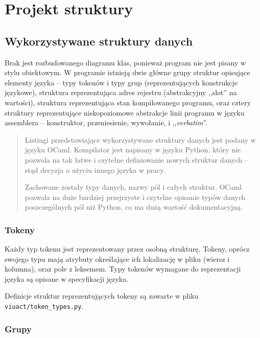 \section{Projekt struktury}

\subsection{Wykorzystywane struktury danych}

Brak jest rozbudowanego diagramu klas, ponieważ program nie jest pisany w stylu obiektowym.
W programie istnieją dwie główne grupy struktur opisujące elementy języka -- typy tokenów i typy grup
(reprezentujących konstrukcje językowe), struktura reprezentująca adres rejestru (abstrakcyjny ,,slot'' na
wartości), struktura reprezentująca stan kompilowanego programu, oraz cztery struktury reprezentujące
niskopoziomowe abstrakcje linii programu w języku assemblera -- konstruktor, przeniesienie, wywołanie, i
,,\emph{verbatim}''.

\begin{quote}
    Listingi przedstawiające wykorzystywane struktury danych jest podany w języku OCaml.
    Kompilator jest napisany w języku Python, który nie pozwala na tak łatwe i czytelne definiowanie
    nowych struktur danych -- stąd decyzja o użyciu innego języka w pracy.

    Zachowane zostały typy danych, nazwy pól i całych struktur. OCaml pozwala na duże bardziej
    przejrzyste i czytelne opisanie typów danych poszczególnych pól niż Python, co ma dużą
    wartość dokumentacyjną.
\end{quote}

\subsubsection{Tokeny}
\label{diagram_klas_tokeny}

Każdy typ tokenu jest reprezentowany przez osobną strukturę. Tokeny, oprócz swojego typu mają atrybuty
określające ich lokalizację w pliku (wiersz i kolumna), oraz pole z leksemem. Typy tokenów wymagane do
reprezentacji języka \ViuAct są opisane w specyfikacji języka.

Definicje struktur reprezentujących tokeny są zawarte w pliku \texttt{viuact/token\_types.py}.

\subsubsection{Grupy}
\label{diagram_klas_grupy}

